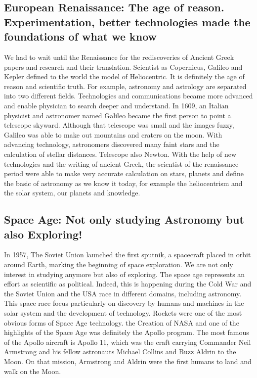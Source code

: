 \subsection*{European Renaissance: The age of reason. Experimentation, better technologies made the foundations of what we know}
We had to wait until the Renaissance for the rediscoveries of Ancient Greek papers and research and their translation. Scientist as Copernicus, Galileo and Kepler defined to the world the model of Heliocentric. It is definitely the age of reason and scientific truth. For example, astronomy and astrology are separated into two different fields. Technologies and communications became more advanced and enable physician to search deeper and understand. In 1609, an Italian physicist and astronomer named Galileo became the first person to point a telescope skyward. Although that telescope was small and the images fuzzy, Galileo was able to make out mountains and craters on the moon. With advancing technology, astronomers discovered many faint stars and the calculation of stellar distances. Telescope also Newton. With the help of new technologies and the writing of ancient Greek, the scientist of the renaissance period were able to make very accurate calculation on stars, planets and define the basic of astronomy as we know it today, for example the heliocentrism and the solar system, our planets and knowledge.



\subsection*{Space Age: Not only studying Astronomy but also Exploring!}
In 1957, The Soviet Union launched the first sputnik, a spacecraft placed in orbit around Earth, marking the beginning of space exploration. We are not only interest in studying anymore but also of exploring. The space age represents an effort as scientific as political. Indeed, this is happening during the Cold War and the Soviet Union and the USA race in different domains, including astronomy. This space race focus particularly on discovery by humans and machines in the solar system and the development of technology. Rockets were one of the most obvious forms of Space Age technology. the Creation of NASA and one of the highlights of the Space Age was definitely the Apollo program. The most famous of the Apollo aircraft is Apollo 11, which was the craft carrying Commander Neil Armstrong and his fellow astronauts Michael Collins and Buzz Aldrin to the Moon. On that mission, Armstrong and Aldrin were the first humans to land and walk on the Moon.